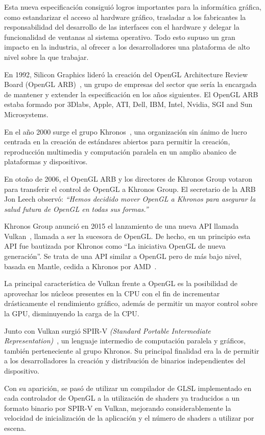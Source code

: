 Esta nueva especificación consiguió logros importantes para la informática gráfica,
como estandarizar el acceso al hardware gráfico, trasladar a los fabricantes la
responsabilidad del desarrollo de las interfaces con el hardware y delegar la
funcionalidad de ventanas al sistema operativo. Todo esto supuso un gran impacto
en la industria, al ofrecer a los desarrolladores una plataforma de alto nivel
sobre la que trabajar.

En 1992, Silicon Graphics lideró la creación del OpenGL Architecture Review
Board (OpenGL ARB)~\cite{OpenGLARB}, un grupo de empresas del sector que sería
la encargada de mantener y extender la especificación en los años siguientes. El
OpenGL ARB estaba formado por 3Dlabs, Apple, ATI, Dell, IBM, Intel, Nvidia, SGI
and Sun Microsystems.

En el año 2000 surge el grupo Khronos~\cite{Khronos}, una organización sin ánimo
de lucro centrada en la creación de estándares abiertos para permitir la
creación, reproducción multimedia y computación paralela en un amplio abanico de
plataformas y dispositivos.

En otoño de 2006, el OpenGL ARB y los directores de Khronos Group
votaron para transferir el control de OpenGL a Khronos Group. El secretario de
la ARB Jon Leech observó: \textit{``Hemos decidido mover OpenGL a Khronos para
		asegurar la salud futura de OpenGL en todas sus
formas.''}~\cite{OpenGLARB}

Khronos Group anunció en 2015 el lanzamiento de una nueva API llamada
Vulkan~\cite{Vulkan}, llamada a ser la sucesora de OpenGL. De hecho, en un
principio esta API fue bautizada por Khronos como ``La iniciativa OpenGL de
nueva generación''. Se trata de una API similar a OpenGL pero de más bajo nivel,
basada en Mantle, cedida a Khronos por AMD~\cite{AMD}.

La principal característica de Vulkan frente a OpenGL es la posibilidad de
aprovechar los núcleos presentes en la CPU con el fin de incrementar
drásticamente el rendimiento gráfico, además de permitir un mayor control sobre
la GPU, disminuyendo la carga de la CPU.

Junto con Vulkan surgió SPIR-V \textit{(Standard Portable Intermediate
Representation)}~\cite{SPIR}, un lenguaje intermedio de computación paralela y
gráficos, también perteneciente al grupo Khronos. Su principal finalidad era la
de permitir a los desarrolladores la creación y distribución de binarios
independientes del dispositivo.

Con su aparición, se pasó de utilizar un compilador de GLSL implementado en cada
controlador de OpenGL a la utilización de shaders ya traducidos a un formato
binario por SPIR-V en Vulkan, mejorando considerablemente la velocidad de
inicialización de la aplicación y el número de shaders a utilizar por escena.

